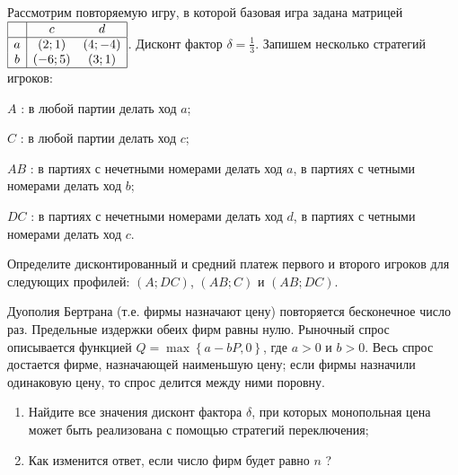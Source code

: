 \begin{problem}

Рассмотрим повторяемую игру, в которой базовая игра задана матрицей  $\begin{array}{|c|cc|}  \hline {} & {c} & {d} \\  \hline {a} & {\left(2;1\right)} & {\left(4;-4\right)} \\ {b} & {\left(-6;5\right)} & {\left(3;1\right)} \\  \hline  \end{array}$. Дисконт фактор  $\delta =\frac{1}{3} $.
Запишем несколько стратегий игроков:\par
 $A$ : в любой партии делать ход  $a$;\par
 $C$ : в любой партии делать ход  $c$;\par
 $AB$ : в партиях с нечетными номерами делать ход  $a$, в партиях с четными номерами делать ход  $b$;\par
 $DC$ : в партиях с нечетными номерами делать ход  $d$, в партиях с четными номерами делать ход  $c$.\par
\item       Определите дисконтированный и средний платеж первого и второго игроков для следующих профилей:  $\left(A;DC\right)$,  $\left(AB;C\right)$  и  $\left(AB;DC\right)$.



\begin{sol}

\end{sol}
\end{problem}



\begin{problem}

Дуополия Бертрана (т.е. фирмы назначают цену) повторяется бесконечное число раз. Предельные издержки обеих фирм равны нулю. Рыночный спрос описывается функцией  $Q=\max \left\{a-bP,0\right\}$, где  $a>0$  и  $b>0$. Весь спрос достается фирме, назначающей наименьшую цену; если фирмы назначили одинаковую цену, то спрос делится между ними поровну.
\begin{enumerate}
\item Найдите все значения дисконт фактора  $\delta $, при которых монопольная цена может быть реализована с помощью стратегий переключения;

\item Как изменится ответ, если число фирм будет равно $n$ ?
\end{enumerate}


\begin{sol}

\end{sol}
\end{problem}



